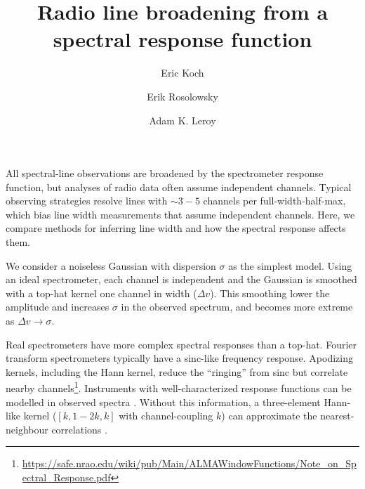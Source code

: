 \documentclass{rnaastex}
\begin{document}
\title{Radio line broadening from a spectral response function}

\author[0000-0001-9605-780X]{Eric Koch}
\author[0000-0002-5204-2259]{Erik Rosolowsky}
\author[0000-0002-2545-1700]{Adam K. Leroy}




\section{}

All spectral-line observations are broadened by the spectrometer response function, but analyses of radio data often assume independent channels.  Typical observing strategies resolve lines with $\sim3-5$ channels per full-width-half-max, which bias line width measurements that assume independent channels.  Here, we compare methods for inferring line width and how the spectral response affects them.

We consider a noiseless Gaussian with dispersion $\sigma$ as the simplest model.  Using an ideal spectrometer, each channel is independent and the Gaussian is smoothed with a top-hat kernel one channel in width ($\Delta v$).  This smoothing lower the amplitude and increases $\sigma$ in the observed spectrum, and becomes more extreme as $\Delta v \rightarrow \sigma$.

Real spectrometers have more complex spectral responses than a top-hat.  Fourier transform spectrometers typically have a sinc-like frequency response.  Apodizing kernels, including the Hann kernel, reduce the ``ringing'' from sinc but correlate nearby channels\footnote{\url{https://safe.nrao.edu/wiki/pub/Main/ALMAWindowFunctions/Note_on_Spectral_Response.pdf}}.  Instruments with well-characterized response functions can be modelled in observed spectra \citep{rosolowsky2008}.  Without this information, a three-element Hann-like kernel ($[k, 1 - 2k, k]$ with channel-coupling $k$) can approximate the nearest-neighbour correlations \citep{leroy2016}.
\end{document}
